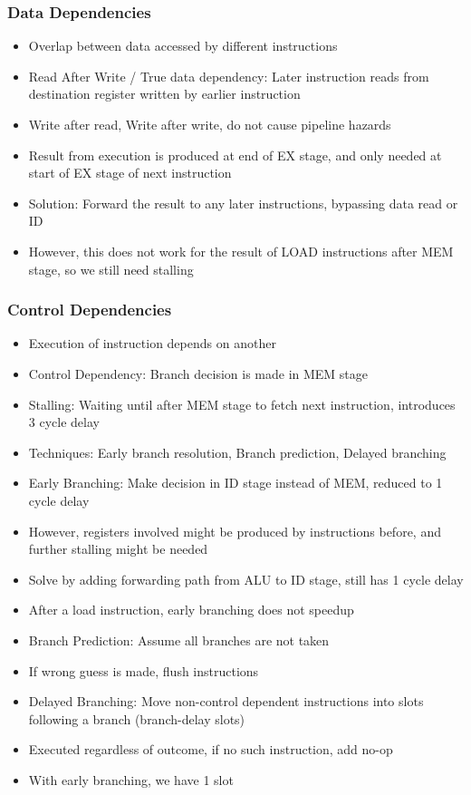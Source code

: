 \documentclass[10pt, portrait]{article}
\begin{document}
\begin{multicols*}{2}
\subsubsection{Data Dependencies}
\begin{itemize}
    \item Overlap between data accessed by different instructions
    \item Read After Write / True data dependency: Later instruction reads from destination register written by earlier instruction
    \item Write after read, Write after write, do not cause pipeline hazards
    \item Result from execution is produced at end of EX stage, and only needed at start of EX stage of next instruction
    \item Solution: Forward the result to any later instructions, bypassing data read or ID
    \item However, this does not work for the result of LOAD instructions after MEM stage, so we still need stalling
\end{itemize}

\subsubsection{Control Dependencies}
\begin{itemize}
    \item Execution of instruction depends on another
     \item Control Dependency: Branch decision is made in MEM stage
    \item Stalling: Waiting until after MEM stage to fetch next instruction, introduces 3 cycle delay
    \item Techniques: Early branch resolution, Branch prediction, Delayed branching
    \item Early Branching: Make decision in ID stage instead of MEM, reduced to 1 cycle delay
    \item However, registers involved might be produced by instructions before, and further stalling might be needed
    \item Solve by adding forwarding path from ALU to ID stage, still has 1 cycle delay
    \item After a load instruction, early branching does not speedup
    \item Branch Prediction: Assume all branches are not taken
    \item If wrong guess is made, flush instructions
    \item Delayed Branching: Move non-control dependent instructions into slots following a branch (branch-delay slots)
    \item Executed regardless of outcome, if no such instruction, add no-op
    \item With early branching, we have 1 slot
\end{itemize}


\end{multicols*}
\end{document}
